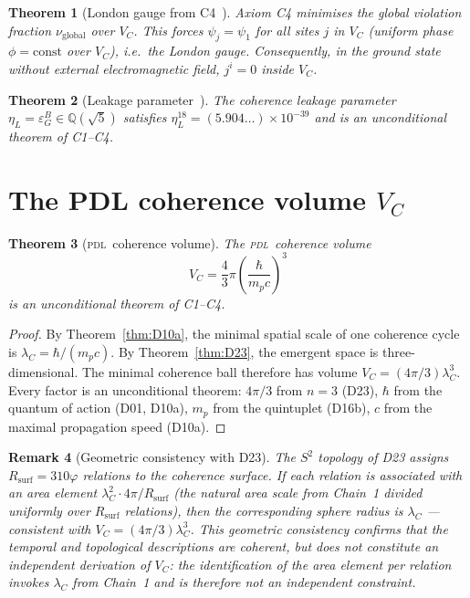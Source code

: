 \documentclass[12pt,a4paper]{article}
\newtheorem{theorem}{Theorem}[section]
\newtheorem{remark}[theorem]{Remark}
\newcommand{\hb}{\hbar}
\newcommand{\PDL}{\textsc{pdl}}
\newcommand{\Rsurf}{R_{\mathrm{surf}}}
\newcommand{\lambdaC}{\lambda_C}
\newcommand{\VC}{V_C}
\newcommand{\etaL}{\eta_L}
\newcommand{\vp}{\varphi}
\begin{document}
\begin{theorem}[London gauge from C4~{\cite{PDL_D49_2026}}]
\label{thm:D49}
Axiom C4 minimises the global violation fraction $\nu_{\mathrm{global}}$ over $\VC$. This forces $\psi_j = \psi_1$ for all sites $j$ in $\VC$ (uniform phase $\phi = \mathrm{const}$ over $\VC$), i.e.\ the London gauge. Consequently, in the ground state without external electromagnetic field, $j^i = 0$ inside $\VC$.
\end{theorem}

\begin{theorem}[Leakage parameter~{\cite{PDL_D17_2026,PDL_D30_2026}}]
\label{thm:etaL}
The coherence leakage parameter $\etaL = \varepsilon_G^B \in \mathbb{Q}(\sqrt{5})$ satisfies $\etaL^{18} = (5.904\ldots)\times 10^{-39}$ and is an unconditional theorem of C1--C4.
\end{theorem}

\section{The PDL coherence volume \texorpdfstring{$V_C$}{VC}}
\label{sec:VC}

\begin{theorem}[\PDL\ coherence volume]
\label{thm:VC}
The \PDL\ coherence volume
\begin{equation}
\VC = \frac{4}{3}\pi\left(\frac{\hb}{m_p c}\right)^3
\label{eq:VC}
\end{equation}
is an unconditional theorem of C1--C4.
\end{theorem}

\begin{proof}
By Theorem~\ref{thm:D10a}, the minimal spatial scale of one coherence cycle is $\lambdaC = \hb/(m_p c)$. By Theorem~\ref{thm:D23}, the emergent space is three-dimensional. The minimal coherence ball therefore has volume $\VC = (4\pi/3)\lambdaC^3$. Every factor is an unconditional theorem: $4\pi/3$ from $n=3$ (D23), $\hb$ from the quantum of action (D01, D10a), $m_p$ from the quintuplet (D16b), $c$ from the maximal propagation speed (D10a).
\end{proof}

\begin{remark}[Geometric consistency with D23]
\label{rem:chain2}
The $S^2$ topology of D23 assigns $\Rsurf = 310\vp$ relations to the coherence surface. If each relation is associated with an area element $\lambdaC^2\cdot 4\pi/\Rsurf$ (the natural area scale from Chain~1 divided uniformly over $\Rsurf$ relations), then the corresponding sphere radius is $\lambdaC$ — consistent with $\VC = (4\pi/3)\lambdaC^3$. This geometric consistency confirms that the temporal and topological descriptions are coherent, but does not constitute an independent derivation of $\VC$: the identification of the area element per relation invokes $\lambdaC$ from Chain~1 and is therefore not an independent constraint.
\end{remark}
\end{document}
